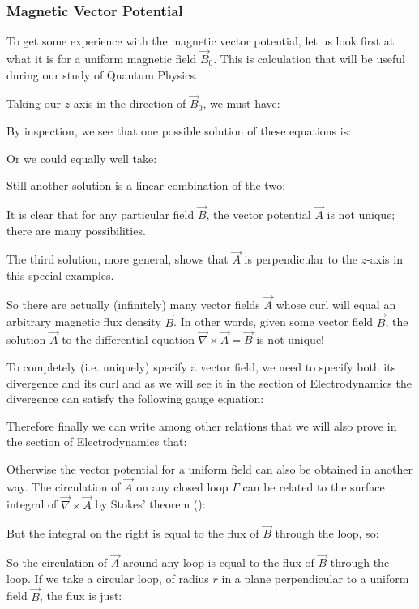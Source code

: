	\pagebreak
	\subsubsection{Magnetic Vector Potential}\label{magnetic vector potential}
	To get some experience with the magnetic vector potential, let us look first at what it is for a uniform magnetic field $\vec{B}_0$. This is calculation that will be useful during our study of Quantum Physics.

	Taking our $z$-axis in the direction of $\vec{B}_0$, we must have:
	
	By inspection, we see that one possible solution of these equations is:
	
	Or we could equally well take:
	
	Still another solution is a linear combination of the two:
	
	It is clear that for any particular field $\vec{B}$, the vector potential $\vec{A}$ is not unique; there are many possibilities.
	
	The third solution, more general, shows that $\vec{A}$ is perpendicular to the $z$-axis in this special examples. 
	
	So there are actually (infinitely) many vector fields $\vec{A}$ whose curl will equal an arbitrary magnetic flux density $\vec{B}$. In other words, given some vector field $\vec{B}$, the solution $\vec{A}$ to the differential equation $\vec{\nabla}\times\vec{A}=\vec{B}$ is not unique!

	To completely (i.e. uniquely) specify a vector field, we need to specify both its divergence and its curl and as we will see it in the section of Electrodynamics the divergence can satisfy the following gauge equation:
	
	Therefore finally we can write among other relations that we will also prove in the section of Electrodynamics that:
	
	Otherwise the vector potential for a uniform field can also be obtained in another way. The circulation of $\vec{A}$ on any closed loop $\Gamma$ can be related to the surface integral of $\vec{\nabla}\times\vec{A}$ by Stokes' theorem ():
	
	But the integral on the right is equal to the flux of $\vec{B}$ through the loop, so:
	
	So the circulation of $\vec{A}$ around any loop is equal to the flux of $\vec{B}$ through the loop. If we take a circular loop, of radius $r$ in a plane perpendicular to a uniform field $\vec{B}$, the flux is just:
	
